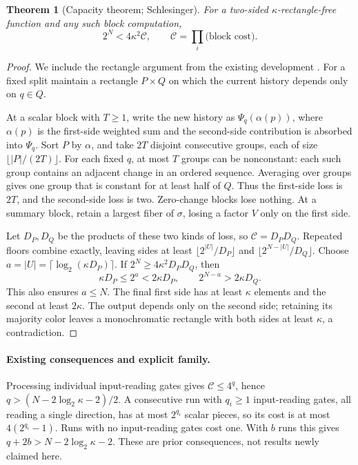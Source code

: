 \documentclass[11pt]{article}
\newtheorem{theorem}{Theorem}[section]
\theoremstyle{definition}
\begin{document}
\begin{theorem}[Capacity theorem; Schlesinger]\label{thm:capacity}
For a two-sided \(\kappa\)-rectangle-free function and any such block computation,
\[
 2^N<4\kappa^2\mathcal C,
 \qquad
 \mathcal C=\prod_i\text{(block cost)}.                   \tag{12}
\]
\end{theorem}
\begin{proof}
We include the rectangle argument from the existing development \cite{Schlesinger26}.
For a fixed split maintain a rectangle \(P\times Q\) on which the current history depends only on \(q\in Q\).

At a scalar block with \(T\ge1\), write the new history as
\(\Psi_q(\alpha(p))\), where \(\alpha(p)\) is the first-side weighted sum and the second-side contribution is absorbed into \(\Psi_q\). Sort \(P\) by \(\alpha\), and take \(2T\) disjoint consecutive groups, each of size \(\lfloor |P|/(2T)\rfloor\). For each fixed \(q\), at most \(T\) groups can be nonconstant: each such group contains an adjacent change in an ordered sequence. Averaging over groups gives one group that is constant for at least half of \(Q\). Thus the first-side loss is \(2T\), and the second-side loss is two. Zero-change blocks lose nothing. At a summary block, retain a largest fiber of \(\sigma\), losing a factor \(V\) only on the first side.

Let \(D_P,D_Q\) be the products of these two kinds of loss, so \(\mathcal C=D_PD_Q\).
Repeated floors combine exactly, leaving sides at least
\(\lfloor2^{|U|}/D_P\rfloor\) and \(\lfloor2^{N-|U|}/D_Q\rfloor\).
Choose \(a=|U|=\lceil\log_2(\kappa D_P)\rceil\).
If \(2^N\ge4\kappa^2D_PD_Q\), then
\[
 \kappa D_P\le2^a<2\kappa D_P,\qquad
 2^{N-a}>2\kappa D_Q.
\]
This also ensures \(a\le N\). The final first side has at least \(\kappa\) elements and the second at least \(2\kappa\). The output depends only on the second side; retaining its majority color leaves a monochromatic rectangle with both sides at least \(\kappa\), a contradiction.
\end{proof}

\paragraph{Existing consequences and explicit family.}
Processing individual input-reading gates gives \(\mathcal C\le4^q\), hence \(q>(N-2\log_2\kappa-2)/2\).
A consecutive run with \(q_i\ge1\) input-reading gates, all reading a single direction, has at most \(2^{q_i}\) scalar pieces, so its cost is at most \(4(2^{q_i}-1)\). Runs with no input-reading gates cost one. With \(b\) runs this gives \(q+2b>N-2\log_2\kappa-2\). These are prior consequences, not results newly claimed here.
\end{document}
